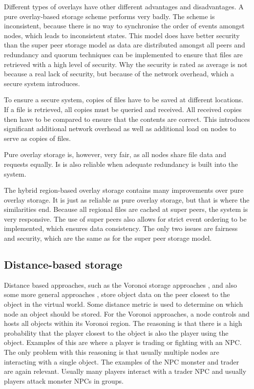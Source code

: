 \documentclass[journal,oneside,a4paper,onecolumn]{IEEEtran}
\begin{document}
Different types of overlays have other different advantages and disadvantages. A pure overlay-based storage scheme performs very badly. The scheme is inconsistent, because there is no way to synchronise the order of events amongst nodes, which leads to inconsistent states. This model does have better security than the super peer storage model as data are distributed amongst all peers and redundancy and quorum techniques can be implemented to ensure that files are retrieved with a high level of security. Why the security is rated as average is not because a real lack of security, but because of the network overhead, which a secure system introduces.

To ensure a secure system, copies of files have to be saved at different locations. If a file is retrieved, all copies must be queried and received. All received copies then have to be compared to ensure that the contents are correct. This introduces significant additional network overhead as well as additional load on nodes to serve as copies of files.

Pure overlay storage is, however, very fair, as all nodes share file data and requests equally. Is is also reliable when adequate redundancy is built into the system.

The hybrid region-based overlay storage contains many improvements over pure overlay storage. It is just as reliable as pure overlay storage, but that is where the similarities end. Because all regional files are cached at super peers, the system is very responsive. The use of super peers also allows for strict event ordering to be implemented, which ensures data consistency. The only two issues are fairness and security, which are the same as for the super peer storage model.

\subsection{Distance-based storage}

Distance based approaches, such as the Voronoi storage approaches \cite{Buyukkaya_voronoi_state_management}, \cite{Hu_voronoi_IM} and also some more general approaches \cite{colyseus_distance_based}, store object data on the peer closest to the object in the virtual world. Some distance metric is used to determine on which node an object should be stored. For the Voronoi approaches, a node controls and hosts all objects within its Voronoi region. The reasoning is that there is a high probability that the player closest to the object is also the player using the object. Examples of this are where a player is trading or fighting with an NPC. The only problem with this reasoning is that usually multiple nodes are interacting with a single object. The examples of the NPC monster and trader are again relevant. Usually many players interact with a trader NPC and usually players attack monster NPCs in groups.
\end{document}
